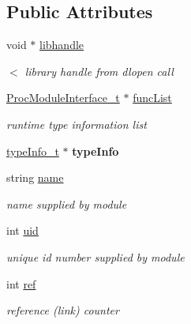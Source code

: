 \subsection*{Public Attributes}
\begin{DoxyCompactItemize}
\item 
void $\ast$ \hyperlink{structActionModule__t_a94e6e256f50f4348101c7a9fb442b4b7}{libhandle}
\begin{DoxyCompactList}\small\item\em $<$ library handle from dlopen call \end{DoxyCompactList}\item 
\mbox{\label{structActionModule__t_a1f9db14fee22694497154dfb3e6cb08a}} 
\hyperlink{structProcModuleInterface__t}{Proc\+Module\+Interface\+\_\+t} $\ast$ \hyperlink{structActionModule__t_a1f9db14fee22694497154dfb3e6cb08a}{func\+List}
\begin{DoxyCompactList}\small\item\em runtime type information list \end{DoxyCompactList}\item 
\mbox{\label{structActionModule__t_af7980386654dffc270e2c654e08c84d7}} 
\hyperlink{structtypeInfo__t}{type\+Info\+\_\+t} $\ast$ {\bfseries type\+Info}
\item 
\mbox{\label{structActionModule__t_ad44b68b4bc09f4aa4a4cb6348fab449e}} 
string \hyperlink{structActionModule__t_ad44b68b4bc09f4aa4a4cb6348fab449e}{name}
\begin{DoxyCompactList}\small\item\em name supplied by module \end{DoxyCompactList}\item 
\mbox{\label{structActionModule__t_abf46b1d8d1c8101e30a3ea22420c61f5}} 
int \hyperlink{structActionModule__t_abf46b1d8d1c8101e30a3ea22420c61f5}{uid}
\begin{DoxyCompactList}\small\item\em unique id number supplied by module \end{DoxyCompactList}\item 
\mbox{\label{structActionModule__t_a0ce7424ee92422bc9533fae56021fcfe}} 
int \hyperlink{structActionModule__t_a0ce7424ee92422bc9533fae56021fcfe}{ref}
\begin{DoxyCompactList}\small\item\em reference (link) counter \end{DoxyCompactList}\end{DoxyCompactItemize}


